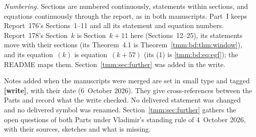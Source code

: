 \documentclass[11pt,letterpaper]{article}
\theoremstyle{remark}\newtheorem{remark}[theorem]{Remark}
\begin{document}
\emph{Numbering.} Sections are numbered continuously, statements within sections, and equations continuously through the report, as in both manuscripts. Part~I keeps Report~176's Sections~1--11 and all its statement and equation numbers. Report~178's Section~$k$ is Section~$k+11$ here (Sections~12--25), its statements move with their sections (its Theorem~4.1 is Theorem~\ref{tmm:bd:thm:window}), and its equation~$(k)$ is equation~$(k+57)$ (its (1) is \eqref{tmm:bd:eq:egf}); the README maps them. Section~\ref{tmm:sec:further} was added in the write.

Notes added when the manuscripts were merged are set in small type and tagged \textbf{[write]}, with their date (6~October 2026). They give cross-references between the Parts and record what the write checked. No delivered statement was changed and no delivered symbol was renamed. Section~\ref{tmm:sec:further} gathers the open questions of both Parts under Vladimir's standing rule of 4~October 2026, with their sources, sketches and what is missing.
\end{document}

